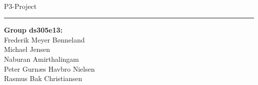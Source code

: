 \newcommand{\HRule}[1]{\hfill \rule{0.2\linewidth}{#1}}

\thispagestyle{empty}
\vspace*{1.5cm}

\noindent \colorbox{Sapphire}{
\parbox[t]{1.0\linewidth}{
\centering \fontsize{45pt}{80pt}\selectfont
\vspace*{1.0cm}
        \textcolor{White}{
\vspace*{0.7cm}
        }
}
}
\\[2em]
\huge P3-Project

\vfill
\flushright
\flushright \rule[20pt]{0.1pt}{9em} \begin{minipage}[b]{0.50\linewidth}
{
\Large
\textbf{Group ds305e13:} \\
Frederik Meyer Bønneland\\
Michael Jensen\\
Naburan Amirthalingam\\
Peter Gurnæs Havbro Nielsen\\
Rasmus Bak Christiansen\\
}
\end{minipage}
\clearpage 
